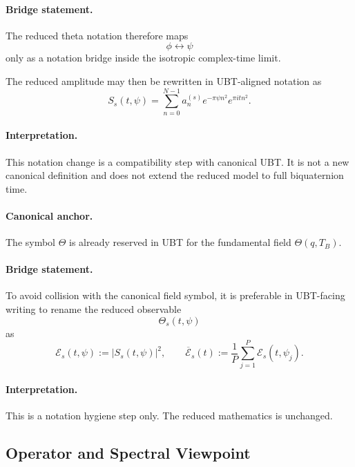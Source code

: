 \documentclass[11pt,a4paper]{article}
\begin{document}
\paragraph{Bridge statement.}
The reduced theta notation therefore maps
\begin{equation}
\phi \longleftrightarrow \psi
\end{equation}
only as a notation bridge inside the isotropic complex-time limit.

The reduced amplitude may then be rewritten in UBT-aligned notation as
\begin{equation}
S_s(t,\psi)
=
\sum_{n=0}^{N-1}
a_n^{(s)} e^{-\pi \psi n^2} e^{\pi i t n^2}.
\end{equation}

\paragraph{Interpretation.}
This notation change is a compatibility step with canonical UBT. It is not a new canonical definition and does not extend the reduced model to full biquaternion time.

\paragraph{Canonical anchor.}
The symbol $\Theta$ is already reserved in UBT for the fundamental field $\Theta(q,T_B)$.

\paragraph{Bridge statement.}
To avoid collision with the canonical field symbol, it is preferable in UBT-facing writing to rename the reduced observable
\begin{equation}
\Theta_s(t,\psi)
\end{equation}
as
\begin{equation}
\mathcal{E}_s(t,\psi) := \left|S_s(t,\psi)\right|^2,
\qquad
\overline{\mathcal{E}}_s(t) := \frac{1}{P}\sum_{j=1}^{P}\mathcal{E}_s(t,\psi_j).
\end{equation}

\paragraph{Interpretation.}
This is a notation hygiene step only. The reduced mathematics is unchanged.

\subsection{Operator and Spectral Viewpoint}
\end{document}
